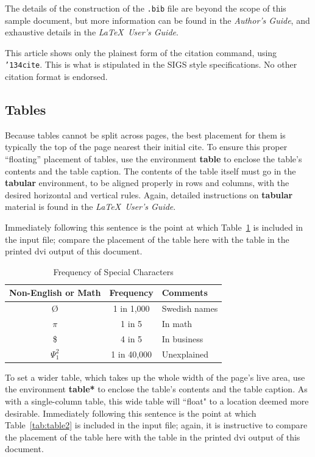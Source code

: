 \documentclass[article]{stucosrec}
\begin{document}
	The details of the construction of the \texttt{.bib} file are beyond the scope of this sample document, but more information can be found in the \textit{Author's Guide}, and exhaustive details in the \textit{\LaTeX\ User's Guide}\cite{Lamport:LaTeX}.
	
	This article shows only the plainest form of the citation command, using \texttt{{\char'134}cite}.
	This is what is stipulated in the SIGS style specifications.
	No other citation format is endorsed.
	
	\subsection{Tables}
	
	Because tables cannot be split across pages, the best placement for them is typically the top of the page nearest their initial cite.
	To ensure this proper ``floating'' placement of tables, use the environment \textbf{table} to enclose the table's contents and the table caption.
	The contents of the table itself must go in the \textbf{tabular} environment, to be aligned properly in rows and columns, with the desired horizontal and vertical rules.
	Again, detailed instructions on \textbf{tabular} material is found in the \textit{\LaTeX\ User's Guide}.
	
	Immediately following this sentence is the point at which Table~\ref{tab:table1} is included in the input file; compare the placement of the table here with the table in the printed dvi output of this document.
	
	\begin{table}
		\centering
		\caption{Frequency of Special Characters}
		\label{tab:table1}
		\begin{tabular}{|c|c|l|} \hline
			Non-English or Math&Frequency&Comments\\ \hline
			\O & 1 in 1,000& Swedish names\\ \hline
			$\pi$ & 1 in 5& In math\\ \hline
			\$ & 4 in 5 & In business\\ \hline
			$\Psi^2_1$ & 1 in 40,000& Unexplained \\ \hline
		\end{tabular}
	\end{table}

	To set a wider table, which takes up the whole width of the page's live area, use the environment \textbf{table*} to enclose the table's contents and the table caption.
	As with a single-column table, this wide table will ``float" to a location deemed more desirable.
	Immediately following this sentence is the point at which Table~\ref{tab:table2} is included in the input file; again, it is instructive to compare the placement of the table here with the table in the printed dvi output of this document.
	
\end{document}
